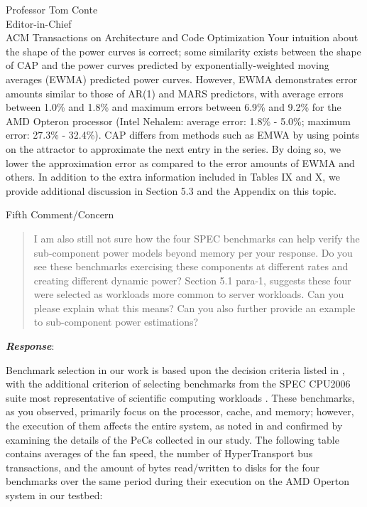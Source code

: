 \documentclass[10pt]{letter} %
\newenvironment{rviewcomment}
{~\\%
\begin{bfseries}}
{\end{bfseries}}
\newcommand{\rviewresponse}{\textbf{\textit{Response}}:}
\begin{document}
\begin{letter}{Professor Tom Conte \\
Editor-in-Chief \\
ACM Transactions on Architecture and Code Optimization }
Your intuition about the shape of the power curves is correct; some
similarity exists between the shape of CAP and the power curves
predicted by exponentially-weighted moving averages (EWMA) predicted
power curves.  However, EWMA demonstrates error amounts similar to those
of AR(1) and MARS predictors, with average errors between 1.0\% and
1.8\% and maximum errors between 6.9\% and 9.2\% for the AMD Opteron
processor (Intel Nehalem: average error: 1.8\% - 5.0\%; maximum error:
27.3\% - 32.4\%). CAP differs from methods such as EMWA by using points
on the attractor to approximate the next entry in the series.  By doing
so, we lower the approximation error as compared to the error amounts of
EWMA and others.  In addition
to the extra information included in Tables IX and X, we provide
additional discussion in Section 5.3 and the Appendix on this topic.
\newpage
\begin{rviewcomment}
  Fifth Comment/Concern
\end{rviewcomment}
\begin{quote}
  \begin{itshape}
    I am also still not sure how the four SPEC benchmarks can help
    verify the sub-component power models beyond memory per your
    response. Do you see these benchmarks exercising these components at
    different rates and creating different dynamic power? Section 5.1
    para-1, suggests these four were selected as workloads more common
    to server workloads. Can you please explain what this means? Can you
    also further provide an example to sub-component power estimations?
  \end{itshape}
\end{quote}
\rviewresponse

Benchmark selection in our work is based upon the decision criteria
listed in \cite{Phansalkar2007}, with the additional criterion of
selecting benchmarks from the SPEC CPU2006 suite most representative of
scientific computing workloads \cite{Cisco2010}.  These benchmarks, as
you observed, primarily focus on the processor, cache, and memory; however,
the execution of them affects the entire system, as noted in
\cite{Ye2007} and confirmed by examining the details of the
PeCs collected in our study.  The following table contains averages of
the fan speed, the number of HyperTransport bus transactions, and the amount
of bytes read/written to disks for the four benchmarks over the same period
during their execution on the AMD Operton system in our testbed:


\end{letter}
\end{document}
